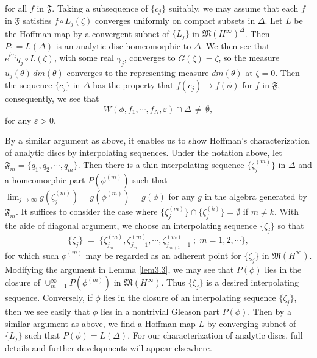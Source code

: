 \documentclass[12pt]{amsart}
\theoremstyle{plain}
\numberwithin{equation}{section}
\begin{document}
for all $f$ in $\mathfrak{F}$. Taking a subsequence of $\{c_j\}$
suitably, we may assume that each $f$ in $\mathfrak{F}$ satisfies
$f\circ L_j(\zeta)$ converges uniformly on compact subsets in $\Delta$.
Let $L$ be the Hoffman map by a convergent subnet of $\{L_j\}$ in
$\mathfrak{M}(H^\infty)^\Delta$. Then $P_1=L(\Delta)$ is an
analytic disc homeomorphic to $\Delta$. We then see that
$e^{i\gamma_j} q_j\circ L(\zeta)$, with some real $\gamma_j$,
converges to $G(\zeta)=\zeta$, so the measure
$u_j(\theta)\,dm(\theta)$ converges to the representing measure
$dm(\theta)$ at $\zeta=0$. Then the sequence $\{c_j\}$ in $\Delta$
has the property that $f(c_j)\to f(\phi)$ for $f$ in $\mathfrak{F}$,
consequently, we see that
$$
W(\phi, f_1,\cdots, f_N, \varepsilon)\cap \Delta\,\neq\,\emptyset,
$$
for any $\varepsilon >0$.

By a similar argument as above, it enables us to show Hoffman's
characterization of analytic discs by interpolating sequences.
Under the notation above, let $\mathfrak{F}_m = \{q_1, q_2, \cdots, q_m\}$.
Then there is a thin interpolating sequence $\{\zeta^{(m)}_j\}$ in
$\Delta$ and a homeomorphic part $P(\phi^{(m)})$ such that
$\lim_{j\to\infty} g(\zeta^{(m)}_j) = g(\phi^{(m)})=g(\phi)$ for any $g$
in the algebra generated by $\mathfrak{F}_m$. It suffices to consider
the case where $\{\zeta^{(m)}_j\}\cap \{\zeta^{(k)}_j\}=\emptyset$
if $m\neq k$. With the aide of diagonal argument, we choose an
interpolating sequence $\{\zeta_j\}$ so that
$$
\{\zeta_j\}\;=\;\{\zeta^{(m)}_{j_m}, \zeta^{(m)}_{j_m+1},
\cdots ,\zeta^{(m)}_{j_{m+1}-1} \;;\;
m=1, 2, \cdots \},
$$
for which such $\phi^{(m)}$ may be regarded as an adherent
point for $\{\zeta_j\}$ in $\mathfrak{M}(H^\infty)$.
Modifying the argument in Lemma \ref{lem3.3}, we may see
that $P(\phi)$ lies in the closure
of $\cup_{m=1}^\infty P(\phi^{(m)})$ in $\mathfrak{M}(H^\infty)$.
Thus $\{\zeta_j\}$ is a desired interpolating sequence.
Conversely, if $\phi$ lies in the closure of an interpolating
sequence $\{\zeta_j\}$, then we see easily that $\phi$ lies
in a nontrivial Gleason part $P(\phi)$. Then by a similar
argument as above, we find a Hoffman map $L$ by converging
subnet of $\{L_j\}$ such that $P(\phi)=L(\Delta)$. For our
characterization of analytic discs, full details and further
developments will appear elsewhere.
\end{document}
